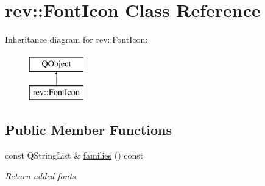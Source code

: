 \hypertarget{classrev_1_1_font_icon}{}\section{rev\+::Font\+Icon Class Reference}
\label{classrev_1_1_font_icon}
Inheritance diagram for rev\+::Font\+Icon\+:\begin{figure}[H]
\begin{center}
\leavevmode
\includegraphics[height=2.000000cm]{classrev_1_1_font_icon}
\end{center}
\end{figure}
\subsection*{Public Member Functions}
\begin{DoxyCompactItemize}
\item 
\mbox{\label{classrev_1_1_font_icon_ab85abd9d5f856342ef0adef15b433358}} 
const Q\+String\+List \& \mbox{\hyperlink{classrev_1_1_font_icon_ab85abd9d5f856342ef0adef15b433358}{families}} () const
\begin{DoxyCompactList}\small\item\em Return added fonts. \end{DoxyCompactList}\end{DoxyCompactItemize}
